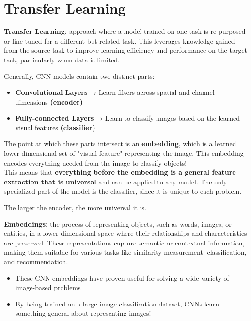 \section{Transfer Learning}
\begin{definition}
    \textbf{Transfer Learning:} approach where a model trained on one task is re-purposed or fine-tuned for a different but related task. This leverages knowledge gained from the source task to improve learning efficiency and performance on the target task, particularly when data is limited.
\end{definition}

Generally, CNN models contain two distinct parts:

\begin{itemize}
    \item \textbf{Convolutional Layers} → Learn filters across spatial and channel dimensions \textbf{(encoder)}
    \item \textbf{Fully-connected Layers} → Learn to classify images based on the learned visual features \textbf{(classifier)}
\end{itemize}

The point at which these parts intersect is an \textbf{embedding}, which is a learned lower-dimensional set of "visual feature" representing the image. This embedding encodes everything needed from the image to classify objects! \\
This means that\textbf{ everything before the embedding is a general feature extraction that is universal} and can be applied to any model. The only specialized part of the model is the classifier, since it is unique to each problem. 

\begin{idea}
    The larger the encoder, the more universal it is. 
\end{idea}

\begin{definition}
    \textbf{Embeddings:} the process of representing objects, such as words, images, or entities, in a lower-dimensional space where their relationships and characteristics are preserved. These representations capture semantic or contextual information, making them suitable for various tasks like similarity measurement, classification, and recommendation.
\end{definition}

\begin{itemize}
    \item These CNN embeddings have proven useful for solving a wide variety of image-based problems
    \item By being trained on a large image classification dataset, CNNs learn something general about representing images!
\end{itemize}


